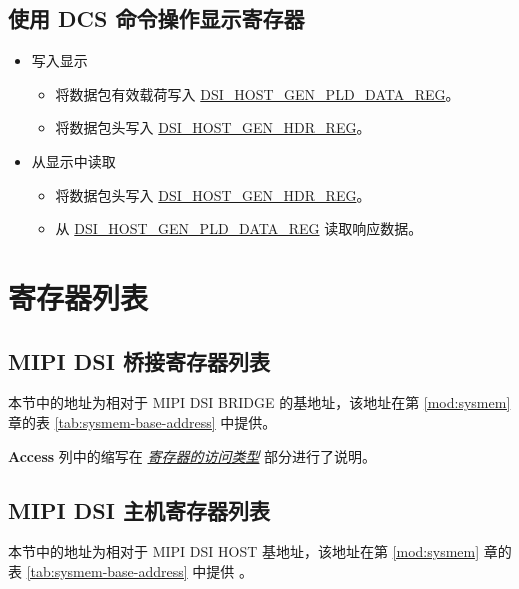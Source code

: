 \documentclass[main\_\_CN.tex]{subfiles}
\begin{document}
\subsection{使用 DCS 命令操作显示寄存器}
\begin{itemize}
    \item 写入显示
        \begin{itemize}
            \item 将数据包有效载荷写入 \hyperref[regdesc:DSIHOSTGENPLDDATAREG]{DSI\_HOST\_GEN\_PLD\_DATA\_REG}。
            \item 将数据包头写入 \hyperref[regdesc:DSIHOSTGENHDRREG]{DSI\_HOST\_GEN\_HDR\_REG}。
        \end{itemize}
    \item 从显示中读取
        \begin{itemize}
            \item 将数据包头写入 \hyperref[regdesc:DSIHOSTGENHDRREG]{DSI\_HOST\_GEN\_HDR\_REG}。
            \item 从 \hyperref[regdesc:DSIHOSTGENPLDDATAREG]{DSI\_HOST\_GEN\_PLD\_DATA\_REG} 读取响应数据。
        \end{itemize}
\end{itemize}




\newpage
\hypertarget{mipidsi-reg-summ}{}
\section{寄存器列表}
\label{sec:mipidsi-reg-summ}

\subsection{MIPI DSI 桥接寄存器列表}
本节中的地址为相对于 MIPI DSI BRIDGE 的基地址，该地址在第 \ref{mod:sysmem} 章的表 \ref{tab:sysmem-base-address} \textit{} 中提供。

\textbf{Access} 列中的缩写在 \hyperref[glossary-access-types]{\textit{寄存器的访问类型}} 部分进行了说明。



\subsection{MIPI DSI 主机寄存器列表}
本节中的地址为相对于 MIPI DSI HOST 基地址，该地址在第 \ref{mod:sysmem} 章的表 \ref{tab:sysmem-base-address} 中提供 \textit{}。
\end{document}

